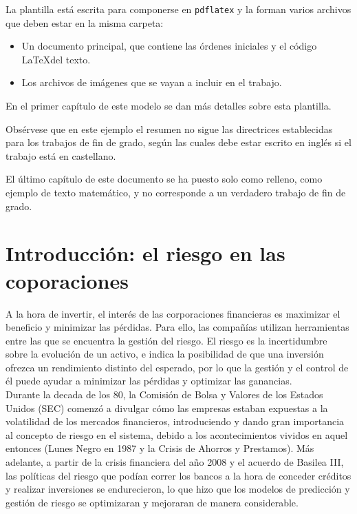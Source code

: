 \documentclass[11pt]{book}
\newcommand{\clearemptydoublepage}{\newpage{\pagestyle{empty}\cleardoublepage}}
\theoremstyle{plain} %
\theoremstyle{definition} %
\begin{document}
La plantilla está escrita para componerse en \texttt{pdflatex} y la forman varios 
archivos que deben estar en la misma carpeta:
\begin{itemize}
\item Un documento principal, que contiene las órdenes iniciales y el código \LaTeX del texto.
\item Los archivos de imágenes que se vayan a incluir en el trabajo.
\end{itemize}

En el primer capítulo de este modelo se dan más detalles sobre esta plantilla.

Obsérvese que en este ejemplo el resumen no sigue las directrices 
establecidas para los trabajos de fin de grado, según las cuales debe estar 
escrito en inglés si el trabajo está en castellano.

El último capítulo de este documento se ha puesto solo como relleno, como ejemplo 
de texto matemático, y no corresponde a un verdadero trabajo de fin de grado.


\clearemptydoublepage

\tableofcontents

\clearemptydoublepage

\mainmatter                      %
\pagestyle{miestilo}    %

\chapter{Introducción: el riesgo en las coporaciones}
A la hora de invertir, el interés de las corporaciones financieras es maximizar 
el beneficio y minimizar las pérdidas. Para ello, las compañías utilizan 
herramientas entre las que se encuentra la gestión del riesgo. El riesgo 
es la incertidumbre sobre la evolución de un activo, e indica la posibilidad 
de que una inversión ofrezca un rendimiento distinto del esperado, por lo 
que la gestión y el control de él puede ayudar a minimizar las pérdidas y 
optimizar las ganancias.\\

Durante la decada de los 80, la Comisión de Bolsa y Valores de los Estados 
Unidos (SEC) comenzó a divulgar cómo las empresas estaban expuestas a la 
volatilidad de los mercados financieros, introduciendo y dando gran 
importancia al concepto de riesgo en el sistema, debido a los acontecimientos 
vividos en aquel entonces (Lunes Negro en 1987 y la Crisis de Ahorros y 
Prestamos). Más adelante, a partir de la crisis financiera del año 2008 y el 
acuerdo de Basilea III, las políticas del riesgo que podían correr los bancos 
a la hora de conceder créditos y realizar inversiones se endurecieron, lo que 
hizo que los modelos de predicción y gestión de riesgo se optimizaran y 
mejoraran de manera considerable.\\
\end{document}
